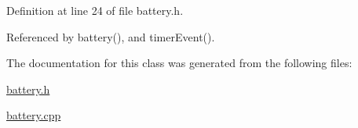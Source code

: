 Definition at line 24 of file battery.\-h.



Referenced by battery(), and timer\-Event().



The documentation for this class was generated from the following files\-:\begin{DoxyCompactItemize}
\item 
\hyperlink{battery_8h}{battery.\-h}\item 
\hyperlink{battery_8cpp}{battery.\-cpp}\end{DoxyCompactItemize}
